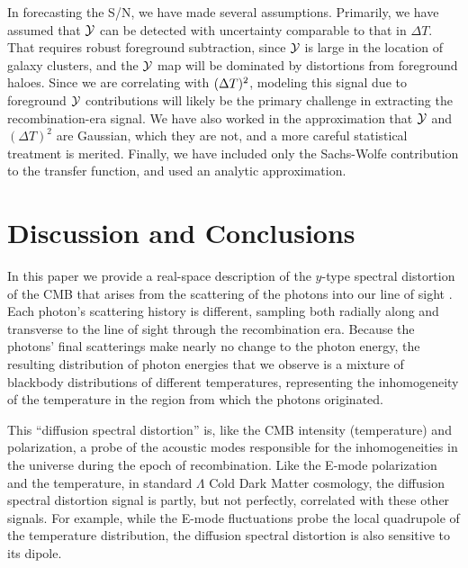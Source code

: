 \documentclass[fleqn,usenatbib]{mnras}
\begin{document}
    In forecasting the S/N, we have made several assumptions.  Primarily, we
    have assumed that ${\cal Y}$ can be detected with uncertainty comparable to
    that in $\Delta T$.  That requires robust foreground subtraction, since
    $\mathcal{Y}$ is large in the location of galaxy clusters, and the $\mathcal{Y}$ map will be
    dominated by distortions from foreground haloes.  Since we are correlating
    with $({\Delta T})^2$, modeling this signal due to foreground $\mathcal{Y}$
    contributions will likely be the primary challenge in extracting the
    recombination-era signal.  We have also worked in the approximation that
    ${\cal Y}$ and $(\Delta T)^2$ are Gaussian, which they are not, and a more
    careful statistical treatment is merited.  Finally, we have included only
    the Sachs-Wolfe contribution to the transfer function, and used an analytic
    approximation.



\section{Discussion and Conclusions} \label{sec:conclusion}

    In this paper we provide a real-space description of the $y$-type spectral
    distortion of the CMB that arises from the scattering of the photons into
    our line of sight \citep{Zeldovich+1972}.  Each photon's scattering history
    is different, sampling both radially along and transverse to the line of
    sight through the recombination era.  Because the photons' final scatterings
    make nearly no change to the photon energy, the resulting distribution of
    photon energies that we observe is a mixture of blackbody distributions of
    different temperatures, representing the inhomogeneity of the temperature in
    the region from which the photons originated.

    This ``diffusion spectral distortion'' is, like the CMB intensity
    (temperature) and polarization, a probe of the acoustic modes responsible
    for the inhomogeneities in the universe during the epoch of recombination.
    Like the E-mode polarization and the temperature, in standard $\Lambda$ Cold
    Dark Matter cosmology, the diffusion spectral distortion signal is partly,
    but not perfectly, correlated with these other signals.  For example, while
    the E-mode fluctuations probe the local quadrupole of the temperature
    distribution, the diffusion spectral distortion is also sensitive to its
    dipole.
\end{document}
